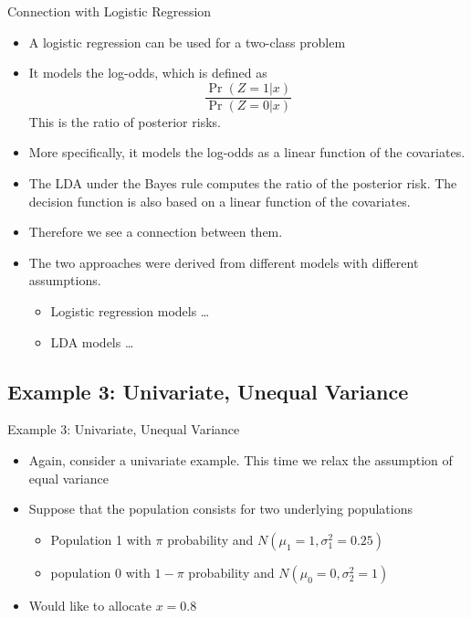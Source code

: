 \documentclass[
  ignorenonframetext,
]{beamer}
\providecommand{\tightlist}{%
  \setlength{\itemsep}{0pt}\setlength{\parskip}{0pt}}
\begin{document}
\begin{frame}{Connection with Logistic Regression}
\protect\hypertarget{connection-with-logistic-regression}{}
\begin{itemize}
\tightlist
\item
  A logistic regression can be used for a two-class problem
\item
  It models the log-odds, which is defined as
  \[\frac{\Pr(Z=1|x)}{{\Pr(Z=0|x)}}\] This is the ratio of posterior
  risks.
\item
  More specifically, it models the log-odds as a linear function of the
  covariates.
\item
  The LDA under the Bayes rule computes the ratio of the posterior risk.
  The decision function is also based on a linear function of the
  covariates.
\item
  Therefore we see a connection between them.
\item
  The two approaches were derived from different models with different
  assumptions.

  \begin{itemize}
  \tightlist
  \item
    Logistic regression models \ldots{}
  \item
    LDA models \ldots{}
  \end{itemize}
\end{itemize}
\end{frame}

\hypertarget{example-3-univariate-unequal-variance}{%
\subsection{Example 3: Univariate, Unequal
Variance}\label{example-3-univariate-unequal-variance}}

\begin{frame}{Example 3: Univariate, Unequal Variance}
\begin{itemize}
\tightlist
\item
  Again, consider a univariate example. This time we relax the
  assumption of equal variance
\item
  Suppose that the population consists for two underlying populations

  \begin{itemize}
  \tightlist
  \item
    Population 1 with \(\pi\) probability and
    \(N(\mu_1=1, \sigma_1^2=0.25)\)
  \item
    population 0 with \(1-\pi\) probability and
    \(N(\mu_0=0, \sigma_2^2=1)\)
  \end{itemize}
\item
  Would like to allocate \(x=0.8\)
\end{itemize}
\end{frame}
\end{document}
